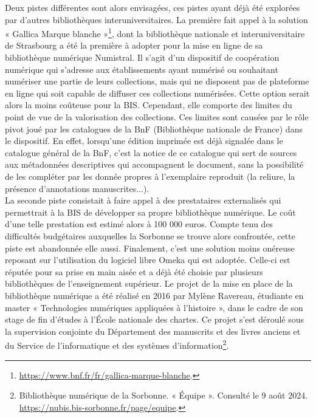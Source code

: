 \documentclass[a4paper,12pt,twoside]{book}
\begin{document}
Deux pistes différentes sont alors envisagées, ces pistes ayant déjà été explorées par d'autres bibliothèques interuniversitaires. La première fait appel à la solution « Gallica Marque blanche »\footnote{
	\url{https://www.bnf.fr/fr/gallica-marque-blanche}.}, dont la bibliothèque nationale et interuniversitaire de Strasbourg a été la première à adopter pour la mise en ligne de sa bibliothèque numérique Numistral. Il s'agit d'un dispositif de coopération numérique qui s’adresse aux établissements ayant numérisé ou souhaitant numériser une partie de leurs collections, mais qui ne disposent pas de plateforme en ligne qui soit capable de diffuser ces collections numérisées. Cette option serait alors la moins coûteuse pour la BIS. Cependant, elle comporte des limites du point de vue de la valorisation des collections. Ces limites sont causées par le rôle pivot joué par les catalogues de la BnF (Bibliothèque nationale de France) dans le dispositif. En effet, lorsqu'une édition imprimée est déjà signalée dans le catalogue général de la BnF, c'est la notice de ce catalogue qui sert de sources aux métadonnées descriptives qui accompagnent le document, sans la possibilité de les compléter par les donnée propres à l'exemplaire reproduit (la reliure, la présence d'annotations manuscrites...).
 \\
 
 La seconde piste consistait à faire appel à des prestataires externalisés qui permettrait à la BIS de développer sa propre bibliothèque numérique. Le coût d'une telle prestation est estimé alors à 100 000 euros. Compte tenu des difficultés budgétaires auxquelles la Sorbonne se trouve alors confrontée, cette piste est abandonnée elle aussi. Finalement, c'est une solution moins onéreuse reposant sur l'utilisation du logiciel libre Omeka qui est adoptée. Celle-ci est réputée pour sa prise en main aisée et a déjà été choisie par plusieurs bibliothèques de l'enseignement supérieur. Le projet de la mise en place de la bibliothèque numérique a été réalisé en
2016 par Mylène Ravereau, étudiante en master « Technologies numériques
appliquées à l'histoire », dans le cadre de son stage de fin d'études à
l'École nationale des chartes. Ce projet s'est déroulé
sous la supervision conjointe du Département des manuscrits et des
livres anciens et du Service de l'informatique et des systèmes
d'information\footnote{Bibliothèque numérique de la
	Sorbonne. « Équipe ». Consulté le 9 août 2024.
	\url{https://nubis.bis-sorbonne.fr/page/equipe}.}. \\ 
\end{document}
